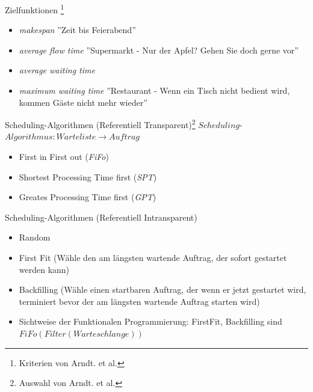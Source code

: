 \documentclass[aspectratio=169,10pt]{beamer}
\begin{document}
\begin{frame}[t,fragile]{Zielfunktionen \footnote{Kriterien von Arndt. et al.}}
\begin{itemize}[<+->]
	\item \emph{makespan} ''Zeit bis Feierabend''
	\item \emph{average flow time} ''Supermarkt - Nur der Apfel? Gehen Sie doch gerne vor''
	\item \emph{average waiting time} 	
	\item \emph{maximum waiting time} ''Restaurant - Wenn ein Tisch nicht bedient wird, kommen G\"aste nicht mehr wieder''
\end{itemize}
\end{frame}

\begin{frame}[t, fragile]{Scheduling-Algorithmen (Referentiell Transparent)\footnote{Auswahl von Arndt. et al.}} 
$Scheduling$-$Algorithmus : Warteliste \rightarrow Auftrag$\\
\pause

\begin{itemize}[<+->]
	\item First in First out (\emph{FiFo})
	\item Shortest Processing Time first (\emph{SPT})
	\item Greates Processing Time first (\emph{GPT})
\end{itemize}
\end{frame}





\begin{frame}[t, fragile]{Scheduling-Algorithmen (Referentiell Intransparent)}
\begin{itemize}[<+->]
	\item Random
	\item \alert{First Fit} (W\"ahle den am l\"angsten wartende Auftrag, der sofort gestartet werden kann)
	\item \alert{Backfilling} (W\"ahle einen startbaren Auftrag, der wenn er jetzt gestartet wird, terminiert bevor der am l\"angsten wartende Auftrag starten wird)
	\item \alert{Sichtweise der Funktionalen Programmierung}: FirstFit, Backfilling sind $FiFo ( Filter (Warteschlange))$
\end{itemize}
\end{frame}
\end{document}
